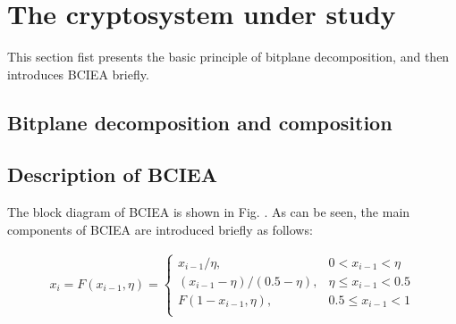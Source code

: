 \documentclass[final,3p,times,twocolumn]{elsarticle}
\begin{document}
\section{The cryptosystem under study}
\label{sec2:BCIEA}

This section fist presents the basic principle of bitplane decomposition, and then introduces BCIEA briefly.
\subsection{Bitplane decomposition and composition}


\subsection{Description of BCIEA}

The block diagram of BCIEA is shown in Fig. . As can be seen, the main components of BCIEA are introduced briefly as follows:


\begin{equation}
\begin{aligned}
x_i = F(x_{i-1},\eta)=	\begin{cases}
x_{i-1}/ \eta,              & 0<x_{i-1}<\eta \\
(x_{i-1}- \eta)/(0.5-\eta), &\eta \le x_{i-1}<0.5 \\
F(1-x_{i-1},\eta),          & 0.5 \le x_{i-1}<1 \\
\end{cases}
\end{aligned}
\label{eq:PWLCM}
\end{equation} 
\end{document}
